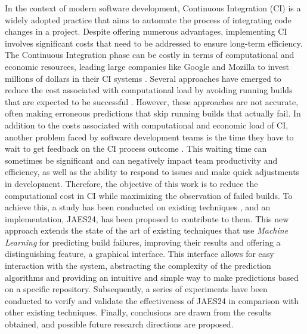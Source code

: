 \vspace{1cm}

In the context of modern software development, Continuous Integration (CI) is a widely adopted
practice that aims to automate the process of integrating code changes in a project. Despite
offering numerous advantages, implementing CI involves significant costs that need to be addressed
to ensure long-term efficiency. The Continuous Integration phase can be costly in terms of
computational and economic resources, leading large companies like Google and Mozilla to invest
millions of dollars in their CI systems \cite{1}. Several approaches have emerged to reduce the
cost associated with computational load by avoiding running builds that are expected to be
successful \cite{2}. However, these approaches are not accurate, often making erroneous
predictions that skip running builds that actually fail. In addition to the costs associated with
computational and economic load of CI, another problem faced by software development teams is the
time they have to wait to get feedback on the CI process outcome \cite{3}. This waiting time can
sometimes be significant and can negatively impact team productivity and efficiency, as well as
the ability to respond to issues and make quick adjustments in development. Therefore, the
objective of this work is to reduce the computational cost in CI while maximizing the observation
of failed builds. To achieve this, a study has been conducted on existing techniques
\cite{2,4,5,6,7,8}, and an implementation, JAES24, has been proposed to contribute to them.
This new approach extends the state of the art of existing techniques that use
\textit{Machine Learning} for predicting build failures, improving their results and offering a
distinguishing feature, a graphical interface. This interface allows for easy interaction with the
system, abstracting the complexity of the prediction algorithms and providing an intuitive and simple
way to make predictions based on a specific repository. Subsequently, a series of experiments have
been conducted to verify and validate the effectiveness of JAES24 in comparison with other
existing techniques. Finally, conclusions are drawn from the results obtained, and possible future
research directions are proposed.

\vspace{0.5cm}

\vfill
